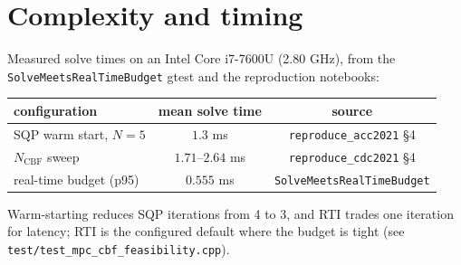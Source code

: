 \documentclass[11pt]{article}
\begin{document}
\section{Complexity and timing}
Measured solve times on an Intel Core i7-7600U (2.80 GHz), from the
\texttt{SolveMeetsRealTimeBudget} gtest and the reproduction notebooks:
\begin{center}
\begin{tabular}{lcc}
\hline
configuration & mean solve time & source \\
\hline
SQP warm start, $N=5$ & $1.3$ ms & \texttt{reproduce\_acc2021} \S4 \\
$N_{\mathrm{CBF}}$ sweep & $1.71$--$2.64$ ms & \texttt{reproduce\_cdc2021} \S4 \\
real-time budget (p95) & $0.555$ ms & \texttt{SolveMeetsRealTimeBudget} \\
\hline
\end{tabular}
\end{center}
Warm-starting reduces SQP iterations from 4 to 3, and RTI trades one iteration for latency; RTI is
the configured default where the budget is tight (see
\texttt{test/test\_mpc\_cbf\_feasibility.cpp}).
\end{document}
